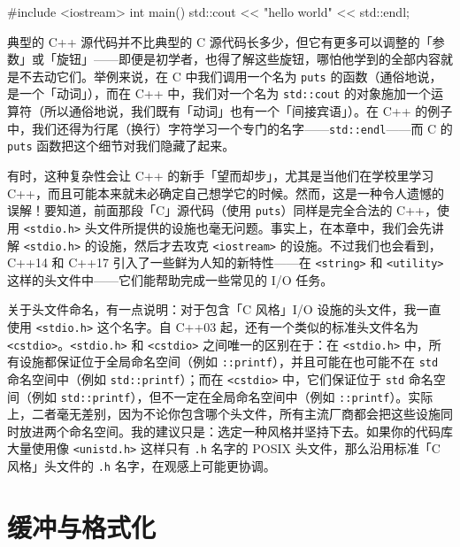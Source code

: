 \begin{codebox}[cpp]
    #include <iostream>
    int main()
    {
      std::cout << "hello world" << std::endl;
    }
\end{codebox}

典型的 C++ 源代码并不比典型的 C 源代码长多少，但它有更多可以调整的「参数」或「旋钮」——即便是初学者，也得了解这些旋钮，哪怕他学到的全部内容就是不去动它们。举例来说，在 C 中我们调用一个名为 \texttt{puts} 的函数（通俗地说，是一个「动词」），而在 C++ 中，我们对一个名为 \texttt{std::\allowbreak{}cout} 的对象施加一个运算符（所以通俗地说，我们既有「动词」也有一个「间接宾语」）。在 C++ 的例子中，我们还得为行尾（换行）字符学习一个专门的名字——\texttt{std::\allowbreak{}endl}——而 C 的 \texttt{puts} 函数把这个细节对我们隐藏了起来。

有时，这种复杂性会让 C++ 的新手「望而却步」，尤其是当他们在学校里学习 C++，而且可能本来就未必确定自己想学它的时候。然而，这是一种令人遗憾的误解！要知道，前面那段「C」源代码（使用 \texttt{puts}）同样是完全合法的 C++，使用 \texttt{<stdio.\allowbreak{}h>\allowbreak{}} 头文件所提供的设施也毫无问题。事实上，在本章中，我们会先讲解 \texttt{<stdio.\allowbreak{}h>\allowbreak{}} 的设施，然后才去攻克 \texttt{<iostream>\allowbreak{}} 的设施。不过我们也会看到，C++14 和 C++17 引入了一些鲜为人知的新特性——在 \texttt{<string>\allowbreak{}} 和 \texttt{<utility>\allowbreak{}} 这样的头文件中——它们能帮助完成一些常见的 I/O 任务。

关于头文件命名，有一点说明：对于包含「C 风格」I/O 设施的头文件，我一直使用 \texttt{<stdio.\allowbreak{}h>\allowbreak{}} 这个名字。自 C++03 起，还有一个类似的标准头文件名为 \texttt{<cstdio>\allowbreak{}}。\texttt{<stdio.\allowbreak{}h>\allowbreak{}} 和 \texttt{<cstdio>\allowbreak{}} 之间唯一的区别在于：在 \texttt{<stdio.\allowbreak{}h>\allowbreak{}} 中，所有设施都保证位于全局命名空间（例如 \texttt{::\allowbreak{}printf}），并且可能在也可能不在 \texttt{std} 命名空间中（例如 \texttt{std::\allowbreak{}printf}）；而在 \texttt{<cstdio>\allowbreak{}} 中，它们保证位于 \texttt{std} 命名空间（例如 \texttt{std::\allowbreak{}printf}），但不一定在全局命名空间中（例如 \texttt{::\allowbreak{}printf}）。实际上，二者毫无差别，因为不论你包含哪个头文件，所有主流厂商都会把这些设施同时放进两个命名空间。我的建议只是：选定一种风格并坚持下去。如果你的代码库大量使用像 \texttt{<unistd.\allowbreak{}h>\allowbreak{}} 这样只有 \texttt{.h} 名字的 POSIX 头文件，那么沿用标准「C 风格」头文件的 \texttt{.h} 名字，在观感上可能更协调。

\section{缓冲与格式化}

